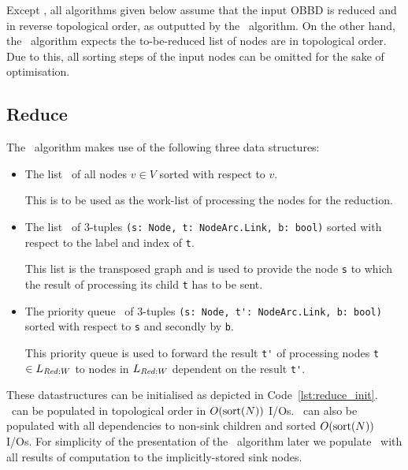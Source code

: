 Except \Reduce, all algorithms given below assume that the input OBBD is reduced
and in reverse topological order, as outputted by the \Reduce\ algorithm. On the
other hand, the \Reduce\ algorithm expects the to-be-reduced list of nodes are
in topological order. Due to this, all sorting steps of the input nodes can
be omitted for the sake of optimisation. \cite{Arge96}

\subsection{Reduce} \label{sec:theory_reduce}
The \Reduce\ algorithm makes use of the following three data structures:

\begin{itemize}
\item The list \ReduceLwork\ of all nodes $v \in V$ sorted with respect to $v$.

  This is to be used as the work-list of processing the nodes for the reduction.

\item The list \ReduceLdep\ of 3-tuples
  \lstinline{(s: Node, t: NodeArc.Link, b: bool)}
  sorted with respect to the label and index of \lstinline{t}.

  This list is the transposed graph and is used to provide the node
  \lstinline{s} to which the result of processing its child \lstinline{t} has to
  be sent.

\item The priority queue \ReduceQdep\ of 3-tuples
  \lstinline{(s: Node, t': NodeArc.Link, b: bool)} sorted with
  respect to \lstinline{s} and secondly by \lstinline{b}.

  This priority queue is used to forward the result \lstinline{t'} of processing
  nodes \lstinline{t} $\in L_{\mathit{Red:}W}$ to nodes in $L_{\mathit{Red:}W}$ dependent on
  the result \lstinline{t'}.
\end{itemize}
These datastructures can be initialised as depicted in
Code~\ref{lst:reduce_init}. \ReduceLwork\ can be populated in topological
order in $O(\text{sort}(N))$ I/Os. \ReduceLdep\ can also be populated with all
dependencies to non-sink children and sorted $O(\text{sort}(N))$ I/Os. For simplicity
of the presentation of the \Reduce\ algorithm later we populate \ReduceQdep\
with all results of computation to the implicitly-stored sink nodes.

